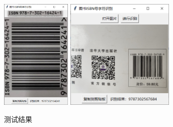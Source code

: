 \documentclass{ctexart}
\begin{document}
\begin{figure}[H]
    \includegraphics[height=150pt]{test_05}\quad
    \includegraphics[height=150pt]{test_06}
    \caption{测试结果}
\end{figure}
\end{document}
